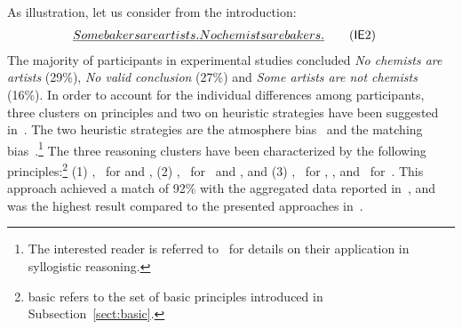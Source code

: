 \documentclass[12pt]{article}
\begin{document}
As illustration, let us consider \mbox{\MI{}} from the introduction: 
\begin{align}
 \emph{Some bakers are artists. } & \emph{No chemists are bakers.} \tag{\MI\ME 2} 
\end{align}
The majority of participants in experimental studies
concluded \emph{No chemists are artists} (29\%), \emph{No valid conclusion} (27\%)
and \emph{Some artists are not chemists} (16\%).
In order to account for the individual differences among participants, three clusters on principles and two on heuristic strategies have been suggested
in~\cite{declare:2017}. The two heuristic strategies are the atmosphere bias~\cite{woodworth:sells:1935} and the matching bias~\cite{Wetherick1995}.\footnote{
The interested reader is referred to~\cite{declare:2017} for details on their application in syllogistic reasoning. 
}
The three reasoning clusters have been characterized by the following principles:\footnote{{\footnotesize\textsf{basic}} refers to the set of basic principles introduced in Subsection~\ref{sect:basic}.} (1) \basic, \converse\ for \MI and \abduction,
    (2) \basic, \converse\ for \MI\ and \negFailure, and
    (3) \basic, \converse\ for \MI, \ME, and \contraposition\ for~\MA.
This approach achieved a match of 92\% with the aggregated data reported in~\cite{khemlani:2012}, and was the highest result compared to the presented approaches in~\cite{khemlani:2012}.
\end{document}
